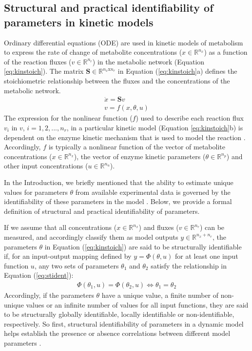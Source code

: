 \documentclass[10pt]{article}
\begin{document}
	\subsection{Structural and practical identifiability of parameters in kinetic models}\label{sec:ident_def}
	Ordinary differential equations (ODE) are used in kinetic models of metabolism to express the rate of change of metabolite concentrations ($x\in\mathbb{R}^{n_x}$) as a function of the reaction fluxes ($v\in\mathbb{R}^{n_r}$) in the metabolic network (Equation \ref{eq:kinstoich}). The matrix $\mathbf{S}\in\mathbb{R}^{n_x \text{x} n_r}$ in Equation (\ref{eq:kinstoich}a) defines the stoichiometric relationship between the fluxes and the concentrations of the metabolic network.
	\begin{subequations}\label{eq:kinstoich}
		\begin{align}
		\dot{x} = \mathbf{S}v\\
		v = f(x, \theta, u)
		\end{align}
	\end{subequations}
	The expression for the nonlinear function ($f$) used to describe each reaction flux $v_i$ in $v$, $i={1, 2, ..., n_r}$, in a particular kinetic model (Equation \ref{eq:kinstoich}b) is dependent on the enzyme kinetic mechanism that is used to model the reaction \parencite{Srinivasan2015}. Accordingly, $f$ is typically a nonlinear function of the vector of metabolite concentrations ($x\in \mathbb{R}^{n_x}$), the vector of enzyme kinetic parameters ($\theta\in\mathbb{R}^{n_p}$) and other input concentrations ($u \in \mathbb{R}^{n_u}$). 

	In the Introduction, we briefly mentioned that the ability to estimate unique values for parameters $\theta$ from available experimental data is governed by the identifiability of these parameters in the model \parencite{Ljung1994,Vanlier2012,Berthoumieux2013,Raue2014}. Below, we provide a formal definition of structural and practical identifiability of parameters.
	
	If we assume that all concentrations ($x\in \mathbb{R}^{n_x}$) and fluxes ($v \in \mathbb{R}^{n_r}$) can be measured, and accordingly classify them as model outputs $y \in \mathbb{R}^{n_x + n_r}$, the parameters $\theta$ in Equation (\ref{eq:kinstoich}) are said to be structurally identifiable if, for an input-output mapping defined by $y = \Phi(\theta,u)$ for at least one input function $u$, any two sets of parameters $\theta_1$ and $\theta_2$ satisfy the relationship in Equation (\ref{eq:stident}):
	\begin{align}\label{eq:stident}
	\Phi(\theta_1,u) = \Phi(\theta_2,u) \iff \theta_1 = \theta_2
	\end{align}
	Accordingly, if the parameters $\theta$ have a unique value, a finite number of non-unique values or an infinite number of values for all input functions, they are said to be structurally globally identifiable, locally identifiable or non-identifiable, respectively. So first, structural identifiability of parameters in a dynamic model helps establish the presence or absence correlations between different model parameters \parencite{Rodriguez-Fernandez2006}.
	 	
\end{document}
